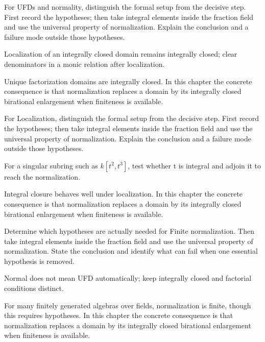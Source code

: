 \begin{exercise}\label{exr:v20-04}
For UFDs and normality, distinguish the formal setup from the decisive step. First record the hypotheses; then take integral elements inside the fraction field and use the universal property of normalization. Explain the conclusion and a failure mode outside those hypotheses.
\end{exercise}
\begin{hint}
Localization of an integrally closed domain remains integrally closed; clear denominators in a monic relation after localization.
\end{hint}
\begin{solution}
Unique factorization domains are integrally closed. In this chapter the concrete consequence is that normalization replaces a domain by its integrally closed birational enlargement when finiteness is available.
\end{solution}

\begin{exercise}\label{exr:v20-05}
For Localization, distinguish the formal setup from the decisive step. First record the hypotheses; then take integral elements inside the fraction field and use the universal property of normalization. Explain the conclusion and a failure mode outside those hypotheses.
\end{exercise}
\begin{hint}
For a singular subring such as \(k[t^2,t^3]\), test whether t is integral and adjoin it to reach the normalization.
\end{hint}
\begin{solution}
Integral closure behaves well under localization. In this chapter the concrete consequence is that normalization replaces a domain by its integrally closed birational enlargement when finiteness is available.
\end{solution}

\begin{exercise}\label{exr:v20-06}
Determine which hypotheses are actually needed for Finite normalization. Then take integral elements inside the fraction field and use the universal property of normalization. State the conclusion and identify what can fail when one essential hypothesis is removed.
\end{exercise}
\begin{hint}
Normal does not mean UFD automatically; keep integrally closed and factorial conditions distinct.
\end{hint}
\begin{solution}
For many finitely generated algebras over fields, normalization is finite, though this requires hypotheses. In this chapter the concrete consequence is that normalization replaces a domain by its integrally closed birational enlargement when finiteness is available.
\end{solution}

